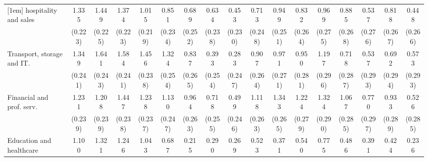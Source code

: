 {\begin{tabular}{l*{16}{c}}
[1em]
hospitality and sales&       1.335\sym{***}&       1.449\sym{***}&       1.374\sym{***}&       1.015\sym{***}&       0.851\sym{***}&       0.689\sym{**} &       0.634\sym{**} &       0.453\sym{*}  &       0.713\sym{**} &       0.949\sym{***}&       0.832\sym{**} &       0.969\sym{***}&       0.885\sym{***}&       0.537         &       0.818\sym{**} &       0.448         \\
                    &     (0.223)         &     (0.225)         &     (0.223)         &     (0.219)         &     (0.234)         &     (0.252)         &     (0.238)         &     (0.230)         &     (0.248)         &     (0.251)         &     (0.264)         &     (0.275)         &     (0.268)         &     (0.276)         &     (0.267)         &     (0.266)         \\
[1em]
Transport, storage and IT.&       1.349\sym{***}&       1.641\sym{***}&       1.584\sym{***}&       1.456\sym{***}&       1.324\sym{***}&       0.837\sym{**} &       0.393         &       0.283         &       0.907\sym{***}&       0.971\sym{***}&       0.950\sym{***}&       1.197\sym{***}&       0.718\sym{*}  &       0.537         &       0.692\sym{*}  &       0.573         \\
                    &     (0.241)         &     (0.243)         &     (0.241)         &     (0.238)         &     (0.254)         &     (0.265)         &     (0.254)         &     (0.247)         &     (0.264)         &     (0.271)         &     (0.281)         &     (0.296)         &     (0.287)         &     (0.293)         &     (0.294)         &     (0.293)         \\
[1em]
Financial and prof. serv.&       1.231\sym{***}&       1.208\sym{***}&       1.447\sym{***}&       1.238\sym{***}&       1.130\sym{***}&       0.964\sym{***}&       0.718\sym{**} &       0.499\sym{*}  &       1.118\sym{***}&       1.343\sym{***}&       1.224\sym{***}&       1.324\sym{***}&       1.067\sym{***}&       0.770\sym{**} &       0.933\sym{**} &       0.526         \\
                    &     (0.239)         &     (0.239)         &     (0.238)         &     (0.237)         &     (0.247)         &     (0.263)         &     (0.255)         &     (0.246)         &     (0.263)         &     (0.265)         &     (0.279)         &     (0.290)         &     (0.285)         &     (0.297)         &     (0.289)         &     (0.285)         \\
[1em]
Education and healthcare&       1.100\sym{***}&       1.321\sym{***}&       1.246\sym{***}&       1.043\sym{***}&       0.687\sym{*}  &       0.215         &       0.290         &       0.269         &       0.523         &       0.371         &       0.540         &       0.775\sym{*}  &       0.486         &       0.391         &       0.424         &       0.236         \\

\end{tabular}}
